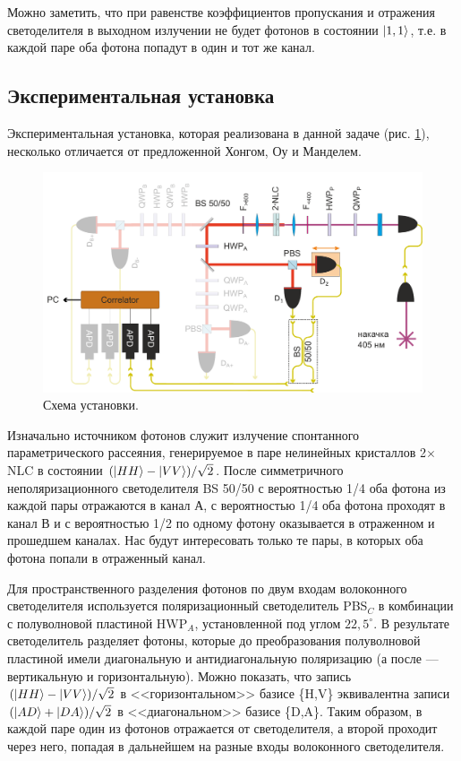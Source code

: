 \documentclass[12pt,a5paper]{article}
\numberwithin{equation}{section}
\begin{document}
Можно заметить, что при равенстве коэффициентов пропускания и отражения светоделителя в выходном излучении не будет фотонов в состоянии $\ket{1,1}$, т.е. в каждой паре оба фотона попадут в один и тот же канал.

\subsection{Экспериментальная установка}
Экспериментальная установка, которая реализована в данной задаче (рис. \ref{fig:Setup_HOM}), несколько отличается от предложенной Хонгом, Оу и Манделем.

\begin{figure}[h]
  \begin{center}
  \includegraphics[width=\linewidth]{Setup_HOM_4.pdf}
  \caption{Схема установки. }\label{fig:Setup_HOM}
  \end{center}
  \end{figure}

Изначально источником фотонов служит излучение спонтанного параметрического рассеяния, генерируемое в паре нелинейных кристаллов 2$\times$NLC в состоянии $(\ket{HH} - \ket{VV})/\sqrt{2}$. После симметричного неполяризационного светоделителя BS 50/50 с вероятностью 1/4 оба фотона из каждой пары отражаются в канал А, с вероятностью 1/4 оба фотона проходят в канал В и с вероятностью 1/2 по одному фотону оказывается в отраженном и прошедшем каналах.  Нас будут интересовать только те пары, в которых оба фотона попали в отраженный канал.

Для пространственного разделения фотонов по двум входам волоконного светоделителя используется поляризационный светоделитель PBS$_C$ в комбинации с полуволновой пластиной HWP$_A$, установленной под углом $22,5^\circ$. В результате светоделитель разделяет фотоны, которые до преобразования полуволновой пластиной имели диагональную и антидиагональную поляризацию (а после --- вертикальную и горизонтальную). Можно показать, что запись $(\ket{HH} - \ket{VV})/\sqrt{2}$ в <<горизонтальном>> базисе \{H,V\} эквивалентна записи $(\ket{AD} + \ket{DA})/\sqrt{2}$ в <<диагональном>> базисе \{D,A\}. Таким образом, в каждой паре один из фотонов отражается от светоделителя, а второй проходит через него, попадая в дальнейшем на разные входы волоконного светоделителя.
\end{document}
